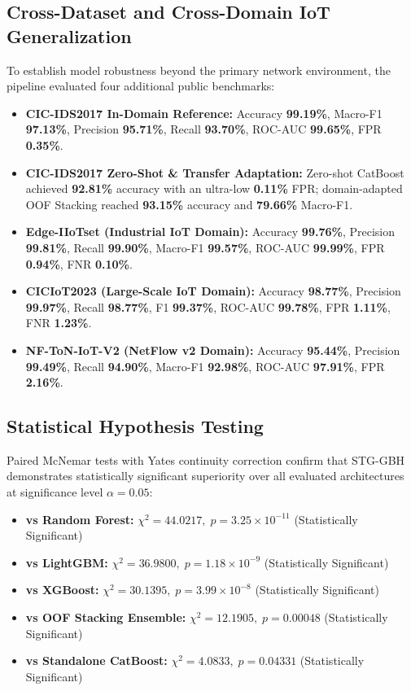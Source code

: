 \documentclass[11pt,a4paper]{article}
\begin{document}
\subsection{Cross-Dataset and Cross-Domain IoT Generalization}
To establish model robustness beyond the primary network environment, the pipeline evaluated four additional public benchmarks:
\begin{itemize}[itemsep=2pt,topsep=2pt]
    \item \textbf{CIC-IDS2017 In-Domain Reference:} Accuracy \textbf{99.19\%}, Macro-F1 \textbf{97.13\%}, Precision \textbf{95.71\%}, Recall \textbf{93.70\%}, ROC-AUC \textbf{99.65\%}, FPR \textbf{0.35\%}.
    \item \textbf{CIC-IDS2017 Zero-Shot \& Transfer Adaptation:} Zero-shot CatBoost achieved \textbf{92.81\%} accuracy with an ultra-low \textbf{0.11\%} FPR; domain-adapted OOF Stacking reached \textbf{93.15\%} accuracy and \textbf{79.66\%} Macro-F1.
    \item \textbf{Edge-IIoTset (Industrial IoT Domain):} Accuracy \textbf{99.76\%}, Precision \textbf{99.81\%}, Recall \textbf{99.90\%}, Macro-F1 \textbf{99.57\%}, ROC-AUC \textbf{99.99\%}, FPR \textbf{0.94\%}, FNR \textbf{0.10\%}.
    \item \textbf{CICIoT2023 (Large-Scale IoT Domain):} Accuracy \textbf{98.77\%}, Precision \textbf{99.97\%}, Recall \textbf{98.77\%}, F1 \textbf{99.37\%}, ROC-AUC \textbf{99.78\%}, FPR \textbf{1.11\%}, FNR \textbf{1.23\%}.
    \item \textbf{NF-ToN-IoT-V2 (NetFlow v2 Domain):} Accuracy \textbf{95.44\%}, Precision \textbf{99.49\%}, Recall \textbf{94.90\%}, Macro-F1 \textbf{92.98\%}, ROC-AUC \textbf{97.91\%}, FPR \textbf{2.16\%}.
\end{itemize}

\subsection{Statistical Hypothesis Testing}
Paired McNemar tests with Yates continuity correction confirm that STG-GBH demonstrates statistically significant superiority over all evaluated architectures at significance level $\alpha = 0.05$:
\begin{itemize}[itemsep=2pt,topsep=2pt]
    \item \textbf{vs Random Forest:} $\chi^2 = 44.0217, \; p = 3.25 \times 10^{-11}$ (Statistically Significant)
    \item \textbf{vs LightGBM:} $\chi^2 = 36.9800, \; p = 1.18 \times 10^{-9}$ (Statistically Significant)
    \item \textbf{vs XGBoost:} $\chi^2 = 30.1395, \; p = 3.99 \times 10^{-8}$ (Statistically Significant)
    \item \textbf{vs OOF Stacking Ensemble:} $\chi^2 = 12.1905, \; p = 0.00048$ (Statistically Significant)
    \item \textbf{vs Standalone CatBoost:} $\chi^2 = 4.0833, \; p = 0.04331$ (Statistically Significant)
\end{itemize}
\end{document}
